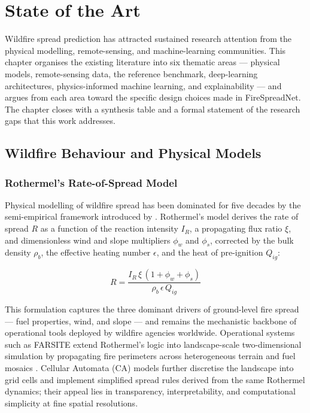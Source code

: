 
\chapter{State of the Art}
\label{chap:sota}

Wildfire spread prediction has attracted sustained research attention from the physical modelling, remote-sensing, and machine-learning communities.
This chapter organises the existing literature into six thematic areas — physical models, remote-sensing data, the reference benchmark, deep-learning architectures, physics-informed machine learning, and explainability — and argues from each area toward the specific design choices made in FireSpreadNet.
The chapter closes with a synthesis table and a formal statement of the research gaps that this work addresses.

\section{Wildfire Behaviour and Physical Models}
\label{sec:sota_physics}

\subsection{Rothermel's Rate-of-Spread Model}

Physical modelling of wildfire spread has been dominated for five decades by the semi-empirical framework introduced by \citet{rothermel1972mathematical}.
Rothermel's model derives the rate of spread $R$ as a function of the reaction intensity $I_R$, a propagating flux ratio $\xi$, and dimensionless wind and slope multipliers $\phi_w$ and $\phi_s$, corrected by the bulk density $\rho_b$, the effective heating number $\epsilon$, and the heat of pre-ignition $Q_{ig}$:

\begin{equation}
    R = \frac{I_R \,\xi\,(1 + \phi_w + \phi_s)}{\rho_b\,\epsilon\,Q_{ig}}
    \label{eq:rothermel}
\end{equation}

This formulation captures the three dominant drivers of ground-level fire spread — fuel properties, wind, and slope — and remains the mechanistic backbone of operational tools deployed by wildfire agencies worldwide.
Operational systems such as FARSITE extend Rothermel's logic into landscape-scale two-dimensional simulation by propagating fire perimeters across heterogeneous terrain and fuel mosaics \citep{finney1998farsite}.
Cellular Automata (CA) models further discretise the landscape into grid cells and implement simplified spread rules derived from the same Rothermel dynamics; their appeal lies in transparency, interpretability, and computational simplicity at fine spatial resolutions.

